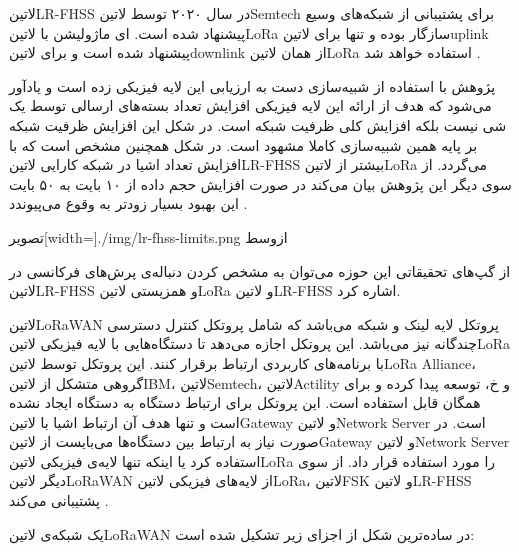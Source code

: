 ‌لاتین{LR-FHSS} در سال ۲۰۲۰ توسط ‌لاتین{Semtech} برای پشتیبانی از شبکه‌های وسیع پیشنهاد شده است.
ای ماژولیشن با ‌لاتین{LoRa} سازگار بوده و تنها برای ‌لاتین{uplink} پیشنهاد شده است و برای ‌لاتین{downlink} از همان
‌لاتین{LoRa} استفاده خواهد شد
.

پژوهش  با استفاده از شبیه‌سازی دست به ارزیابی این لایه فیزیکی زده است و یادآور می‌شود که هدف از ارائه این لایه فیزیکی
افزایش تعداد بسته‌های ارسالی توسط یک شی نیست بلکه افزایش کلی ظرفیت شبکه است. در شکل  این افزایش ظرفیت شبکه بر پایه همین
شبیه‌سازی کاملا مشهود است. در شکل  همچنین مشخص است که با افزایش تعداد اشیا در شبکه کارایی ‌لاتین{LR-FHSS} بیشتر از ‌لاتین{LoRa}
می‌گردد. از سوی دیگر این پژوهش بیان می‌کند در صورت افزایش حجم داده از ۱۰ بایت به ۵۰ بایت این بهبود بسیار زودتر به وقوع می‌پیوندد
.

‌تصویر[width=\textwidth]{./img/lr-fhss-limits.png}
‌ازوسط

از گپ‌های تحقیقاتی این حوزه می‌توان به مشخص کردن دنباله‌ی پرش‌های فرکانسی در ‌لاتین{LR-FHSS} و همزیستی ‌لاتین{LoRa} و ‌لاتین{LR-FHSS} اشاره کرد.


‌لاتین{LoRaWAN} پروتکل لایه لینک و شبکه می‌باشد که شامل پروتکل کنترل دسترسی چندگانه نیز می‌باشد.
این پروتکل اجازه می‌دهد تا دستگاه‌هایی با لایه فیزیکی ‌لاتین{LoRa} با برنامه‌های کاربردی ارتباط برقرار کنند.
این پروتکل توسط ‌لاتین{LoRa Alliance}، گروهی متشکل از ‌لاتین{IBM}، ‌لاتین{Semtech}، ‌لاتین{Actility} و ‌خ،
توسعه پیدا کرده و برای همگان قابل استفاده است.
این پروتکل برای ارتباط دستگاه به دستگاه ایجاد نشده است و تنها هدف آن ارتباط اشیا با ‌لاتین{Gateway} و ‌لاتین{Network Server} است.
در صورت نیاز به ارتباط بین دستگاه‌ها می‌بایست از ‌لاتین{Gateway} و ‌لاتین{Network Server} استفاده کرد یا اینکه
تنها لایه‌ی فیزیکی ‌لاتین{LoRa} را مورد استفاده قرار داد.
از سوی دیگر ‌لاتین{LoRaWAN} از لایه‌های فیزیکی ‌لاتین{LoRa}، ‌لاتین{FSK} و ‌لاتین{LR-FHSS} پشتیبانی می‌کند
.

یک شبکه‌ی ‌لاتین{LoRaWAN} در ساده‌ترین شکل از اجزای زیر تشکیل شده است:


